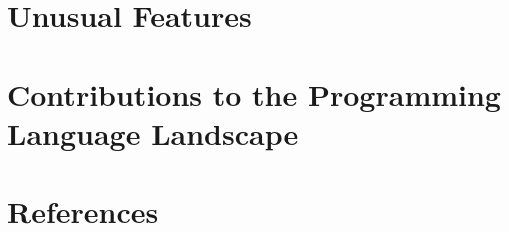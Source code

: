 \documentclass[man]{apa}
\begin{document}


\section{Unusual Features}

\section{Contributions to the Programming Language Landscape}

\section{References}
\end{document}
